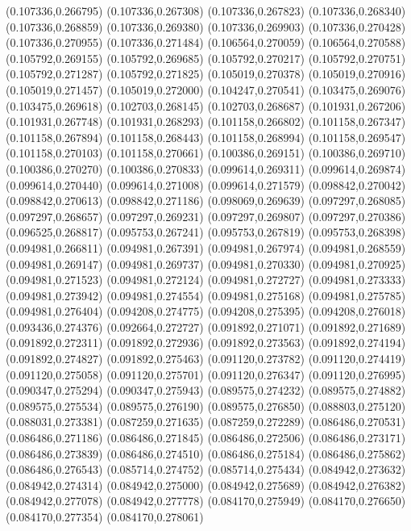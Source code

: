 (0.107336,0.266795)
(0.107336,0.267308)
(0.107336,0.267823)
(0.107336,0.268340)
(0.107336,0.268859)
(0.107336,0.269380)
(0.107336,0.269903)
(0.107336,0.270428)
(0.107336,0.270955)
(0.107336,0.271484)
(0.106564,0.270059)
(0.106564,0.270588)
(0.105792,0.269155)
(0.105792,0.269685)
(0.105792,0.270217)
(0.105792,0.270751)
(0.105792,0.271287)
(0.105792,0.271825)
(0.105019,0.270378)
(0.105019,0.270916)
(0.105019,0.271457)
(0.105019,0.272000)
(0.104247,0.270541)
(0.103475,0.269076)
(0.103475,0.269618)
(0.102703,0.268145)
(0.102703,0.268687)
(0.101931,0.267206)
(0.101931,0.267748)
(0.101931,0.268293)
(0.101158,0.266802)
(0.101158,0.267347)
(0.101158,0.267894)
(0.101158,0.268443)
(0.101158,0.268994)
(0.101158,0.269547)
(0.101158,0.270103)
(0.101158,0.270661)
(0.100386,0.269151)
(0.100386,0.269710)
(0.100386,0.270270)
(0.100386,0.270833)
(0.099614,0.269311)
(0.099614,0.269874)
(0.099614,0.270440)
(0.099614,0.271008)
(0.099614,0.271579)
(0.098842,0.270042)
(0.098842,0.270613)
(0.098842,0.271186)
(0.098069,0.269639)
(0.097297,0.268085)
(0.097297,0.268657)
(0.097297,0.269231)
(0.097297,0.269807)
(0.097297,0.270386)
(0.096525,0.268817)
(0.095753,0.267241)
(0.095753,0.267819)
(0.095753,0.268398)
(0.094981,0.266811)
(0.094981,0.267391)
(0.094981,0.267974)
(0.094981,0.268559)
(0.094981,0.269147)
(0.094981,0.269737)
(0.094981,0.270330)
(0.094981,0.270925)
(0.094981,0.271523)
(0.094981,0.272124)
(0.094981,0.272727)
(0.094981,0.273333)
(0.094981,0.273942)
(0.094981,0.274554)
(0.094981,0.275168)
(0.094981,0.275785)
(0.094981,0.276404)
(0.094208,0.274775)
(0.094208,0.275395)
(0.094208,0.276018)
(0.093436,0.274376)
(0.092664,0.272727)
(0.091892,0.271071)
(0.091892,0.271689)
(0.091892,0.272311)
(0.091892,0.272936)
(0.091892,0.273563)
(0.091892,0.274194)
(0.091892,0.274827)
(0.091892,0.275463)
(0.091120,0.273782)
(0.091120,0.274419)
(0.091120,0.275058)
(0.091120,0.275701)
(0.091120,0.276347)
(0.091120,0.276995)
(0.090347,0.275294)
(0.090347,0.275943)
(0.089575,0.274232)
(0.089575,0.274882)
(0.089575,0.275534)
(0.089575,0.276190)
(0.089575,0.276850)
(0.088803,0.275120)
(0.088031,0.273381)
(0.087259,0.271635)
(0.087259,0.272289)
(0.086486,0.270531)
(0.086486,0.271186)
(0.086486,0.271845)
(0.086486,0.272506)
(0.086486,0.273171)
(0.086486,0.273839)
(0.086486,0.274510)
(0.086486,0.275184)
(0.086486,0.275862)
(0.086486,0.276543)
(0.085714,0.274752)
(0.085714,0.275434)
(0.084942,0.273632)
(0.084942,0.274314)
(0.084942,0.275000)
(0.084942,0.275689)
(0.084942,0.276382)
(0.084942,0.277078)
(0.084942,0.277778)
(0.084170,0.275949)
(0.084170,0.276650)
(0.084170,0.277354)
(0.084170,0.278061)
